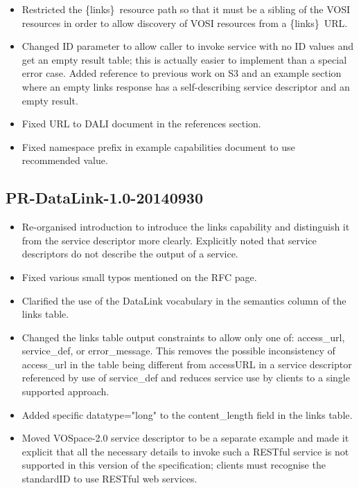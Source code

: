 \documentclass[11pt,a4paper]{ivoa}
\newcommand{\blinks}{\{links\}}
\newcommand{\attval}[2]{#1={\allowbreak}{"}#2{"}}
\begin{document}
\begin{itemize}
\item
Restricted the \blinks\ resource path so that it must be a sibling of
the VOSI resources in order to allow discovery of VOSI resources from
a \blinks\ URL.
\item
Changed ID parameter to allow caller to invoke service with no ID values
and get an empty result table; this is actually easier to implement
than a special error case. Added reference to previous work on S3 and
an example section where an empty links response has a self-describing
service descriptor and an empty result.
\item
Fixed URL to DALI document in the references section.
\item
Fixed namespace prefix in example capabilities document to use recommended
value.
\end{itemize}


\subsection{PR-DataLink-1.0-20140930}

\begin{itemize}
\item
Re-organised introduction to introduce the links capability and
distinguish it from the service descriptor more clearly. Explicitly
noted that service descriptors do not describe the output of a service.
\item
Fixed various small typos mentioned on the RFC page.
\item
Clarified the use of the DataLink vocabulary in the semantics column of
the links table.
\item
Changed the links table output constraints to allow only one of:
access\_url, service\_def, or error\_message. This removes the possible
inconsistency of access\_url in the table being different from accessURL
in a service descriptor referenced by use of service\_def and reduces
service use by clients to a single supported approach.
\item
Added specific \attval{datatype}{long} to the content\_length field in the
links table.
\item
Moved VOSpace-2.0 service descriptor to be a separate example and made
it explicit that all the necessary details to invoke such a RESTful
service is not supported in this version of the specification; clients
must recognise the standardID to use RESTful web services.
\end{itemize}
\end{document}
